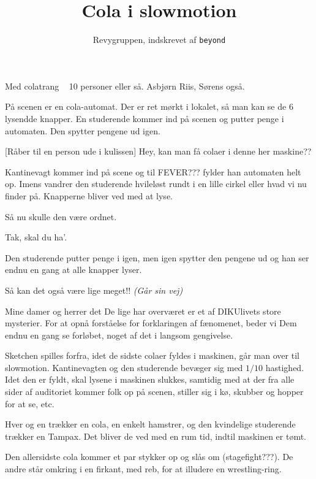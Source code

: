 \documentclass[10pt]{article}
\title{Cola i slowmotion}
\author{Revygruppen, indskrevet af \tt{beyond}}
\begin{document}
\maketitle

\begin{roles}
   Med colatrang
   ~
   10 personer eller så.
   Asbjørn Riis, Sørens også.
\end{roles}

\begin{sketch}

  \scene På scenen er en cola-automat. Der er ret mørkt i lokalet, så man
  kan se de 6 lysendde knapper. En studerende kommer ind på scenen og
  putter penge i automaten. Den spytter pengene ud igen.

   [Råber til en person ude i kulissen] Hey, kan man få colaer i
  denne her maskine??

  \scene Kantinevagt kommer ind på scene og til FEVER??? fylder han
  automaten helt op. Imens vandrer den studerende hvileløst rundt i en
  lille cirkel eller hvad vi nu finder på. Knapperne bliver ved med at lyse.

   Så nu skulle den være ordnet.

   Tak, skal du ha'.

  \scene Den studerende putter penge i igen, men igen spytter den pengene
  ud og han ser endnu en gang at alle knapper lyser.

   Så kan det også være lige meget!! {\em (Går sin vej)}

   Mine damer og herrer det De lige har overværet er et af
  DIKUlivets store mysterier. For at opnå forståelse for forklaringen af
  fænomenet, beder vi Dem endnu en gang se forløbet, noget af det i langsom
  gengivelse.

  \scene Sketchen spilles forfra, idet de sidste colaer fyldes i maskinen,
  går man over til slowmotion. Kantinevagten og den studerende bevæger sig
  med $1/10$ hastighed. Idet den er fyldt, skal lysene i maskinen slukkes,
  samtidig med at der fra alle sider af auditoriet kommer folk op på
  scenen, stiller sig i kø, skubber og hopper for at se, etc. 

  Hver og en trækker en cola, en enkelt hamstrer, og den kvindelige
  studerende trækker en Tampax. Det bliver de ved med en rum tid, indtil
  maskinen er tømt.

  Den allersidste cola kommer et par stykker op og slås om (stagefight???).
  De andre står omkring i en firkant, med reb, for at illudere en
  wrestling-ring.


\end{sketch}
\end{document}

